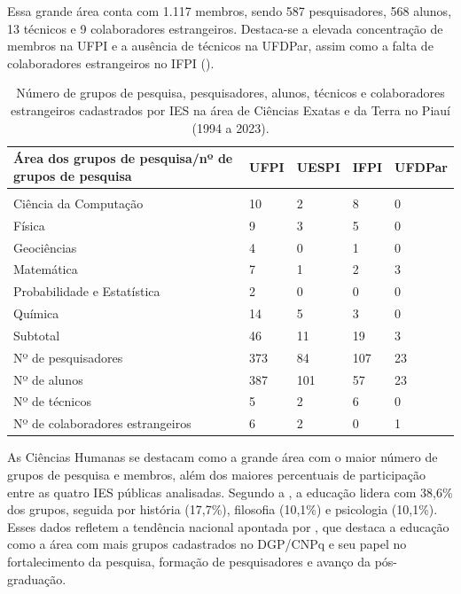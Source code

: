 \documentclass[portuguese]{textolivre}
\begin{document}
Essa grande área conta com 1.117 membros, sendo 587 pesquisadores, 568 alunos, 13 técnicos e 9 colaboradores estrangeiros. Destaca-se a elevada concentração de membros na UFPI e a ausência de técnicos na UFDPar, assim como a falta de colaboradores estrangeiros no IFPI ().

\begin{table}[htbp]
\centering
\begin{threeparttable}
\caption{Número de grupos de pesquisa, pesquisadores, alunos, técnicos e colaboradores estrangeiros cadastrados por IES na área de Ciências Exatas e da Terra no Piauí (1994 a 2023).}
\label{tbl7}
\begin{tabular}{>{\raggedright\arraybackslash}p{5cm} l l l l}
\toprule
Área dos grupos de pesquisa/nº de grupos de pesquisa & UFPI & UESPI & IFPI & UFDPar \\ 
\midrule
\multicolumn{5}{c}{Ciências Exatas e da Terra} \\
\midrule
Ciência da Computação & 10 & 2 & 8 & 0 \\
Física & 9 & 3 & 5 & 0 \\
Geociências & 4 & 0 & 1 & 0 \\
Matemática & 7 & 1 & 2 & 3 \\
Probabilidade e Estatística & 2 & 0 & 0 & 0 \\
Química & 14 & 5 & 3 & 0 \\
\midrule
Subtotal & 46 & 11 & 19 & 3 \\
\midrule
Nº de pesquisadores & 373 & 84 & 107 & 23 \\
Nº de alunos & 387 & 101 & 57 & 23 \\
Nº de técnicos & 5 & 2 & 6 & 0 \\
Nº de colaboradores estrangeiros & 6 & 2 & 0 & 1 \\
\bottomrule
\end{tabular}
\end{threeparttable}
\end{table}

As Ciências Humanas se destacam como a grande área com o maior número de grupos de pesquisa e membros, além dos maiores percentuais de participação entre as quatro IES públicas analisadas. Segundo a , a educação lidera com 38,6\% dos grupos, seguida por história (17,7\%), filosofia (10,1\%) e psicologia (10,1\%). Esses dados refletem a tendência nacional apontada por \textcite{mainardes2021}, que destaca a educação como a área com mais grupos cadastrados no DGP/CNPq e seu papel no fortalecimento da pesquisa, formação de pesquisadores e avanço da pós-graduação.
\end{document}

